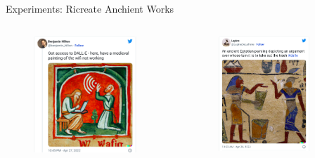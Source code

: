 \documentclass[aspectratio=169, 9pt]{beamer}
\theoremstyle{definition}
\begin{document}
\begin{frame}{Experiments: Ricreate Anchient Works}
  \begin{columns}
    \begin{column}{0.5\textwidth}
      \begin{figure}[h]
        \centering
        \includegraphics[width=0.9\textwidth]{./pic/anchient-work.png}
      \end{figure}
    \end{column}
    \begin{column}{0.5\textwidth}
      \begin{figure}[h]
        \centering
        \includegraphics[width=0.8\textwidth]{./pic/trash-argue.png}

\end{figure}
\end{column}
\end{columns}
\end{frame}
\end{document}
